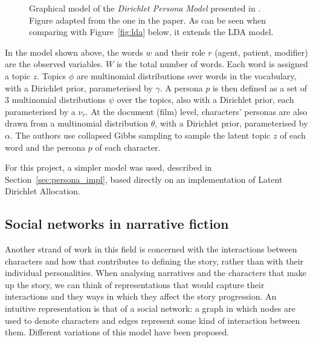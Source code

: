 \documentclass[bsc,frontabs,singlespacing,parskip]{infthesis} %
\begin{document}
\begin{figure}[ht!]
\centering
{}
\caption{Graphical model of the \textit{Dirichlet Persona Model} presented in \cite{Bamman2013}. Figure adapted from the one in the paper. As can be seen when comparing with Figure~\ref{fig:lda} below, it extends the LDA model.}
\end{figure}

In the model shown above, the words $w$ and their role $r$ (agent, patient, modifier) are the observed variables. $W$ is the total number of words. Each word is assigned a topic $z$. Topics $\phi$ are multinomial distributions over words in the vocabulary, with a Dirichlet prior, parameterised by $\gamma$. A persona $p$ is then defined as a set of 3 multinomial distributions $\psi$ over the topics, also with a Dirichlet prior, each parameterised by a $\nu_r$. At the document (film) level, characters' personas are also drawn from a multinomial distribution $\theta$, with a Dirichlet prior, parameterised by $\alpha$. The authors use collapsed Gibbs sampling \cite{griffiths2004finding} to sample the latent topic $z$ of each word and the persona $p$ of each character. 

For this project, a simpler model was used, described in Section~\ref{sec:persona_impl}, based directly on an implementation of Latent Dirichlet Allocation.

\subsection{Social networks in narrative fiction}
Another strand of work in this field is concerned with the interactions between characters and how that contributes to defining the story, rather than with their individual personalities. When analysing narratives and the characters that make up the story, we can think of representations that would capture their interactions and they ways in which they affect the story progression. An intuitive representation is that of a social network: a graph in which nodes are used to denote characters and edges represent some kind of interaction between them. Different variations of this model have been proposed.
\end{document}
